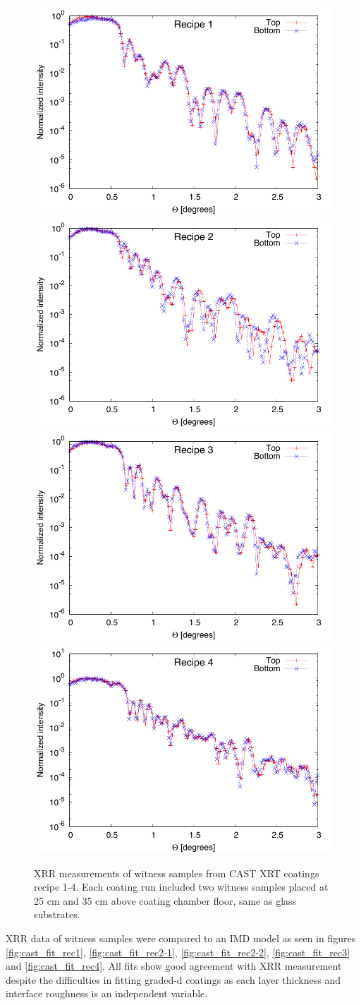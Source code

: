 \begin{figure}[htbp]
  \centering  \includegraphics[width=0.45\linewidth]{figures/cast/cast_recipe1.pdf}  \includegraphics[width=0.45\linewidth]{figures/cast/cast_recipe2.pdf}\\  \includegraphics[width=0.45\linewidth]{figures/cast/cast_recipe3.pdf}  \includegraphics[width=0.45\linewidth]{figures/cast/cast_recipe4.pdf}
  \caption{\footnotesize XRR measurements of witness samples from CAST XRT coatings recipe 1-4. Each coating run included two witness samples placed at 25 cm and 35 cm above coating chamber floor, same as glass substrates.}
  \label{fig:cast_recipe_xrr}
\end{figure}

XRR data of witness samples were compared to an IMD model as seen in figures \ref{fig:cast_fit_rec1}, \ref{fig:cast_fit_rec2-1}, \ref{fig:cast_fit_rec2-2}, \ref{fig:cast_fit_rec3} and \ref{fig:cast_fit_rec4}. All fits show good agreement with XRR measurement despite the difficulties in fitting graded-d coatings as each layer thickness and interface roughness is an independent variable.


